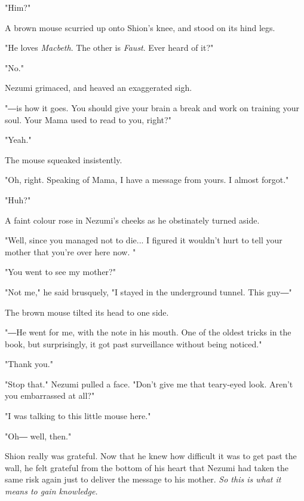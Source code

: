 "Him?"

A brown mouse scurried up onto Shion's knee, and stood on its hind legs.

"He loves \emph{Macbeth}. The other is \emph{Faust}. Ever heard of it?"

"No."

Nezumi grimaced, and heaved an exaggerated sigh.


"―is how it goes. You should give your brain a break and work on
training your soul. Your Mama used to read to you, right?"

"Yeah."

The mouse squeaked insistently.

"Oh, right. Speaking of Mama, I have a message from yours. I almost
forgot."

"Huh?"

A faint colour rose in Nezumi's cheeks as he obstinately turned aside.

"Well, since you managed not to die... I figured it wouldn't hurt to
tell your mother that you're over here now. "

"You went to see my mother?"

"Not me," he said brusquely, "I stayed in the underground tunnel. This
guy―"

The brown mouse tilted its head to one side.

"―He went for me, with the note in his mouth. One of the oldest tricks
in the book, but surprisingly, it got past surveillance without being
noticed."

"Thank you."

"Stop that." Nezumi pulled a face. "Don't give me that teary-eyed look.
Aren't you embarrassed at all?"

"I was talking to this little mouse here."

"Oh― well, then."

Shion really was grateful. Now that he knew how difficult it was to get
past the wall, he felt grateful from the bottom of his heart that Nezumi
had taken the same risk again just to deliver the message to his mother.
\emph{So this is what it means to gain knowledge.}

